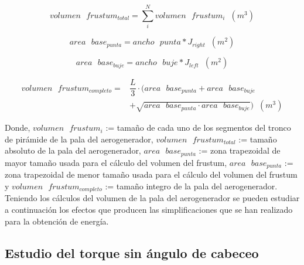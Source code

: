 \begin{equation}
 volumen \text{ } frustum_{total} = \sum_{i}^{N}volumen \text{ } frustum_i \hspace{7pt} (m^3)
\end{equation}

\begin{equation}
 area \text{ } base_{punta} = ancho \text{ } punta * J_{right} \hspace{7pt} (m^2)
 \end{equation}

 \begin{equation}
 area \text{ } base_{buje} = ancho \text{ } buje * J_{left} \hspace{7pt} (m^2)
 \end{equation}
 
 \begin{equation}
    \begin{split}
        volumen \text{ } frustum_{completo} = & \dfrac{L}{3} \cdot ( area \text{ } base_{punta} + area \text{ }  base_{buje}\\
        & + \sqrt{area \text{ } base_{punta} \cdot area \text{ } base_{buje}}) \hspace{7pt} (m^3) 
    \end{split}
 \end{equation}

Donde, $ volumen \text{ } frustum_i $ := tamaño de cada uno de los segmentos del tronco de pirámide de la pala del aerogenerador, $ volumen \text{ } frustum_{total} $ := tamaño absoluto de la pala del aerogenerador, $area \text{ } base_{punta}$ := zona trapezoidal de mayor tamaño usada para el cálculo del volumen del frustum, $area \text{ } base_{punta}$ := zona trapezoidal de menor tamaño usada para el cálculo del volumen del frustum y $ volumen \text{ } frustum_{completo} $ := tamaño integro de la pala del aerogenerador.\\


Teniendo los cálculos del volumen de la pala del aerogenerador se pueden estudiar a continuación los efectos que producen las simplificaciones que se han realizado para la obtención de energía.


\subsection{Estudio del torque sin ángulo de cabeceo}
\label{section:torque_pala_horizontal}

